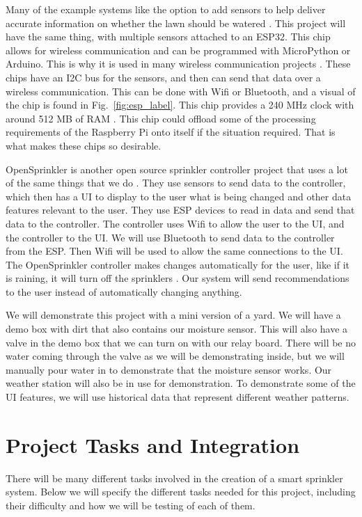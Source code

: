 \documentclass[letterpaper, 10 pt, conference]{ieeeconf}  %
\begin{document}
Many of the example systems like the option to add sensors to help deliver accurate information on whether the lawn should be watered \cite{OpenSprinkler}. This project will have the same thing, with multiple sensors attached to an ESP32. This chip allows for wireless communication and can be programmed with MicroPython or Arduino. This is why it is used in many wireless communication projects \cite{OpenSprinkler}. These chips have an I2C bus for the sensors, and then can send that data over a wireless communication. This can be done with Wifi or Bluetooth, and a visual of the chip is found in Fig.~\ref{fig:esp_label}. This chip provides a 240 MHz clock with around 512 MB of RAM \cite{micropy}. This chip could offload some of the processing requirements of the Raspberry Pi onto itself if the situation required. That is what makes these chips so desirable. 

OpenSprinkler is another open source sprinkler controller project that uses a lot of the same things that we do \cite{OpenSprinkler}. They use sensors to send data to the controller, which then has a UI to display to the user what is being changed and other data features relevant to the user. They use ESP devices to read in data and send that data to the controller. The controller uses Wifi to allow the user to the UI, and the controller to the UI. We will use Bluetooth to send data to the controller from the ESP. Then Wifi will be used to allow the same connections to the UI. The OpenSprinkler controller makes changes automatically for the user, like if it is raining, it will turn off the sprinklers \cite{OpenSprinkler}. Our system will send recommendations to the user instead of automatically changing anything. 

We will demonstrate this project with a mini version of a yard. We will have a demo box with dirt that also contains our moisture sensor. This will also have a valve in the demo box that we can turn on with our relay board. There will be no water coming through the valve as we will be demonstrating inside, but we will manually pour water in to demonstrate that the moisture sensor works. Our weather station will also be in use for demonstration. To demonstrate some of the UI features, we will use historical data that represent different weather patterns. 


\section{Project Tasks and Integration}
There will be many different tasks involved in the creation of a smart sprinkler system. Below we will specify the different tasks needed for this project, including their difficulty and how we will be testing of each of them.
\end{document}
